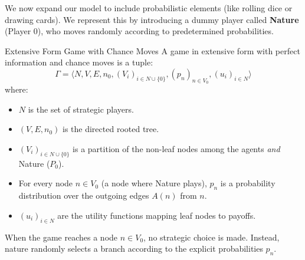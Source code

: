 \documentclass[12pt, a4paper]{article}
\begin{document}
We now expand our model to include probabilistic elements (like rolling dice or drawing cards). We represent this by introducing a dummy player called \textbf{Nature} (Player 0), who moves randomly according to predetermined probabilities.

\begin{defbox}{Extensive Form Game with Chance Moves}
  A game in extensive form with perfect information and chance moves is a tuple:
  \[ \Gamma = \langle N, V, E, n_0, (V_i)_{i \in N \cup \{0\}}, (p_n)_{n \in V_0}, (u_i)_{i \in N} \rangle \]
  where:
  \begin{itemize}
      \item $N$ is the set of strategic players.
      \item $(V, E, n_0)$ is the directed rooted tree.
      \item $(V_i)_{i \in N \cup \{0\}}$ is a partition of the non-leaf nodes among the agents \textit{and} Nature ($P_0$).
      \item For every node $n \in V_0$ (a node where Nature plays), $p_n$ is a probability distribution over the outgoing edges $A(n)$ from $n$.
      \item $(u_i)_{i \in N}$ are the utility functions mapping leaf nodes to payoffs.
  \end{itemize}
\end{defbox}

When the game reaches a node $n \in V_0$, no strategic choice is made. Instead, nature randomly selects a branch according to the explicit probabilities $p_n$.
\end{document}
